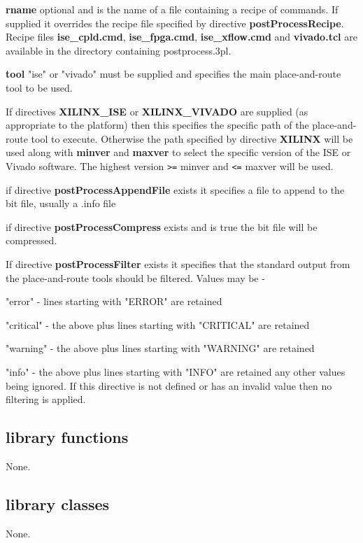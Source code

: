             {\bf rname} optional and is the name of a file containing a recipe
            of commands. If supplied it overrides the recipe file specified by
            directive {\bf postProcessRecipe}. Recipe files
            {\bf ise\_cpld.cmd}, {\bf ise\_fpga.cmd}, {\bf ise\_xflow.cmd}
            and {\bf vivado.tcl} are available in the directory
            containing postprocess.3pl.
            
            {\bf tool} "ise" or "vivado" must be supplied and specifies the
            main place-and-route tool to be used.
            
            If directives {\bf XILINX\_ISE} or {\bf XILINX\_VIVADO} are supplied
            (as appropriate to the platform) then this specifies the specific
            path of the place-and-route tool to execute. Otherwise the path
            specified by directive {\bf XILINX} will be used along with  {\bf
            minver} and {\bf maxver} to select the specific version of the ISE
            or Vivado software. The highest version \verb'>=' minver and
            \verb'<=' maxver will be used.


            if directive {\bf postProcessAppendFile} exists it specifies
            a file to append to the bit file, usually a .info file

            if directive {\bf postProcessCompress} exists and is true
            the bit file will be compressed.

            If directive {\bf postProcessFilter} exists it specifies that the
            standard output from the place-and-route tools should be filtered.
            Values may be -
            \blist
            \item   "error" - lines starting with "ERROR" are retained
            \item   "critical" - the above plus lines starting with "CRITICAL" are
                    retained
            \item   "warning" - the above plus lines starting with "WARNING" are
                    retained
            \item   "info" - the above plus lines starting with "INFO" are
                    retained
            \blend
            any other values being ignored. If this directive is not defined or
            has an invalid value then no filtering is applied.
    
    
    


    \subsection{library functions}
    
        None.


    \subsection{library classes}
    
        None.

